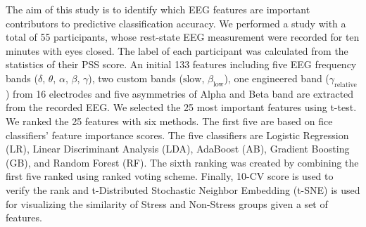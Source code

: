 \documentclass[pdflatex,sn-mathphys]{sn-jnl}%
\theoremstyle{thmstyleone}%
\theoremstyle{thmstyletwo}%
\theoremstyle{thmstylethree}%
\begin{document}
The aim of this study is to identify which EEG features are important contributors to predictive classification accuracy. We performed a study with a total of 55 participants, whose rest-state EEG measurement were recorded for ten minutes with eyes closed. The label of each participant was calculated from the statistics of their PSS score. An initial 133 features including five EEG frequency bands ($\delta$, $\theta$, $\alpha$, $\beta$, $\gamma$), two custom bands ($\text{slow}$, $\beta_{\text{low}}$), one engineered band ($\gamma_{\text{relative}}$) from 16 electrodes and five asymmetries of Alpha and Beta band are extracted from the recorded EEG. We selected the 25 most important features using t-test. We ranked the 25 features with six methods. The first five are based on fice classifiers' feature importance scores. The five classifiers are Logistic Regression (LR), Linear Discriminant Analysis (LDA), AdaBoost (AB), Gradient Boosting (GB), and Random Forest (RF). The sixth ranking was created by combining the first five ranked using ranked voting scheme. Finally, 10-CV score is used to verify the rank and t-Distributed Stochastic Neighbor Embedding (t-SNE) is used for visualizing the similarity of Stress and Non-Stress groups given a set of features.

\end{document}
